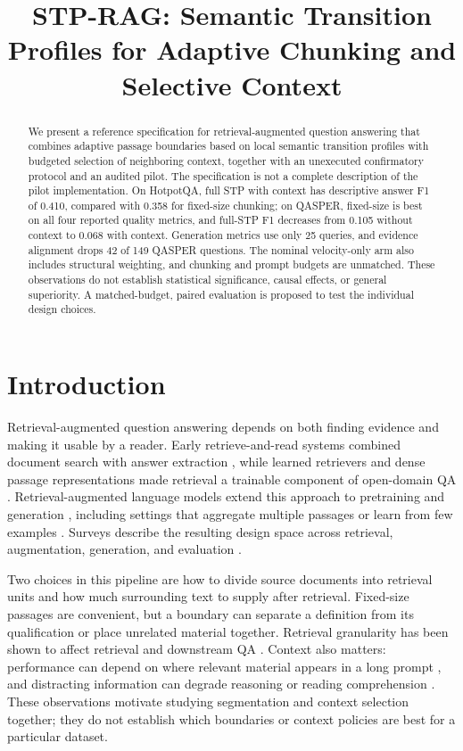 \documentclass[10pt]{article}
\title{STP-RAG: Semantic Transition Profiles for Adaptive Chunking and Selective Context}
\author{}
\date{}
\begin{document}
\maketitle
\begin{abstract}
We present a reference specification for retrieval-augmented question answering that combines adaptive passage boundaries based on local semantic transition profiles with budgeted selection of neighboring context, together with an unexecuted confirmatory protocol and an audited pilot. The specification is not a complete description of the pilot implementation. On HotpotQA, full STP with context has descriptive answer F1 of 0.410, compared with 0.358 for fixed-size chunking; on QASPER, fixed-size is best on all four reported quality metrics, and full-STP F1 decreases from 0.105 without context to 0.068 with context. Generation metrics use only 25 queries, and evidence alignment drops 42 of 149 QASPER questions. The nominal velocity-only arm also includes structural weighting, and chunking and prompt budgets are unmatched. These observations do not establish statistical significance, causal effects, or general superiority. A matched-budget, paired evaluation is proposed to test the individual design choices.
\end{abstract}
\section{Introduction}

Retrieval-augmented question answering depends on both finding evidence and making it usable by a reader. Early retrieve-and-read systems combined document search with answer extraction \cite{Chen2017ReadingWikipedia}, while learned retrievers and dense passage representations made retrieval a trainable component of open-domain QA \cite{Lee2019LatentRetrieval,Karpukhin2020DensePassage}. Retrieval-augmented language models extend this approach to pretraining and generation \cite{Guu2020RealmRetrievalaugmented,Lewis2020RetrievalaugmentedGeneration}, including settings that aggregate multiple passages or learn from few examples \cite{Izacard2020LeveragingPassage,Izacard2022FewshotLearning}. Surveys describe the resulting design space across retrieval, augmentation, generation, and evaluation \cite{Gao2023RetrievalaugmentedGeneration,Fan2024SurveyRag,Zhao2024RetrievalaugmentedGeneration,Yu2024EvaluationRetrievalaugmented}.

Two choices in this pipeline are how to divide source documents into retrieval units and how much surrounding text to supply after retrieval. Fixed-size passages are convenient, but a boundary can separate a definition from its qualification or place unrelated material together. Retrieval granularity has been shown to affect retrieval and downstream QA \cite{Chen2023DenseX}. Context also matters: performance can depend on where relevant material appears in a long prompt \cite{Liu2023LostMiddle}, and distracting information can degrade reasoning or reading comprehension \cite{Shi2023LargeLanguage,Jia2017AdversarialExamples}. These observations motivate studying segmentation and context selection together; they do not establish which boundaries or context policies are best for a particular dataset.
\end{document}

